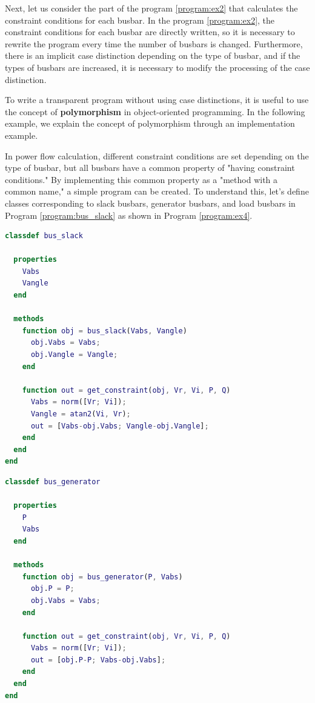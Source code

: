 \documentclass[graybox, envcountchap]{svmult}
\begin{document}
Next, let us consider the part of the program \ref{program:ex2} that calculates
the constraint conditions for each busbar. In the program \ref{program:ex2}, the
constraint conditions for each busbar are directly written, so it is necessary
to rewrite the program every time the number of busbars is changed. Furthermore,
there is an implicit case distinction depending on the type of busbar, and if
the types of busbars are increased, it is necessary to modify the processing of
the case distinction.

To write a transparent program without using case distinctions, it is useful to
use the concept of \textbf{polymorphism} in object-oriented programming. In the
following example, we explain the concept of polymorphism through an
implementation example.

\begin{example}
In power flow calculation, different constraint conditions are set depending on
the type of busbar, but all busbars have a common property of "having constraint
conditions." By implementing this common property as a "method with a common
name," a simple program can be created. To understand this, let's define
classes corresponding to slack busbars, generator busbars, and load busbars in
Program \ref{program:bus_slack} as shown in Program \ref{program:ex4}.

\begin{lstlisting}[language=Matlab, caption=bus\_slack.m, label={program:bus_slack}]
classdef bus_slack
  
  properties
    Vabs
    Vangle
  end
  
  methods
    function obj = bus_slack(Vabs, Vangle)
      obj.Vabs = Vabs;
      obj.Vangle = Vangle;
    end
    
    function out = get_constraint(obj, Vr, Vi, P, Q)
      Vabs = norm([Vr; Vi]);
      Vangle = atan2(Vi, Vr);
      out = [Vabs-obj.Vabs; Vangle-obj.Vangle];
    end
  end
end
\end{lstlisting}


\begin{lstlisting}[language=Matlab, caption=bus\_generator.m, label={program:bus_PV}]
classdef bus_generator
  
  properties
    P
    Vabs
  end
  
  methods
    function obj = bus_generator(P, Vabs)
      obj.P = P;
      obj.Vabs = Vabs;
    end
    
    function out = get_constraint(obj, Vr, Vi, P, Q)
      Vabs = norm([Vr; Vi]);
      out = [obj.P-P; Vabs-obj.Vabs];
    end
  end
end
\end{lstlisting}


\end{example}
\end{document}
